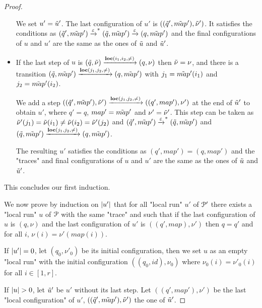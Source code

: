 \begin{proof}
\begin{itemize}
	We set $u' = \Tilde{u}'$. The last configuration of $u'$ is $((\Tilde{q}', \Tilde{map}'), \Tilde{\nu}')$. It satisfies the conditions as $(\Tilde{q}', \Tilde{map}') \xrightarrow{\varepsilon}^* (\Tilde{q}, \Tilde{map}') \xrightarrow{\varepsilon} (q, \Tilde{map}')$ and the final configurations of $u$ and $u'$ are the same as the ones of $\Tilde{u}$ and $\Tilde{u}'$.
		
	\item 
	If the last step of $u$ is $(\Tilde{q}, \Tilde{\nu}) \xrightarrow{\textbf{loc}(i_1,i_2,{\ne})} (q, \nu)$ then $\Tilde{\nu} = \nu$, and there is a transition $(\Tilde{q}, \Tilde{map}') \xrightarrow{\textbf{loc}(j_1,j_2,{\ne})} (q, \Tilde{map}')$ with $j_1=\Tilde{map}'(i_1)$ and $j_2=\Tilde{map}'(i_2)$.
	
	We add a step $((\Tilde{q}', \Tilde{map}'), \Tilde{\nu}') \xrightarrow{\textbf{loc}(j_1,j_2,{\ne})} ((q', map'), \nu')$ at the end of $\Tilde{u}'$ to obtain $u'$, where $q' = q$, $map' = \Tilde{map}'$ and $\nu' = \Tilde{\nu}'$. 
	This step can be taken as $\Tilde{\nu}'(j_1) = \Tilde{\nu}(i_1) \neq \Tilde{\nu}(i_2) = \Tilde{\nu}'(j_2)$ and $(\Tilde{q}', \Tilde{map}') \xrightarrow{\varepsilon}^* (\Tilde{q}, \Tilde{map}')$ and $(\Tilde{q}, \Tilde{map}') \xrightarrow{\textbf{loc}(j_1,j_2,{\ne})} (q, \Tilde{map}')$.   
	
	The resulting $u'$ satisfies the conditions as $(q', map') = (q, map')$ and the "traces" and final configurations of $u$ and $u'$ are the same as the ones of $\Tilde{u}$ and $\Tilde{u}'$.
\end{itemize}
	
	This concludes our first induction.
	
	We now prove by induction on $|u'|$ that for all "local run" $u'$ of $\mathcal{P}'$ there exists a "local run" $u$ of $\mathcal{P}$ with the same "trace" and such that if the last configuration of $u$ is $(q,\nu)$ and the last configuration of $u'$ is $((q',map), \nu')$ then $q=q'$ and for all $i$, $\nu(i) = \nu'(map(i))$.  
	
	If $|u'| = 0$, let $(q_0, \nu'_0)$ be its initial configuration, then we  set $u$ as an empty "local run" with the initial configuration $((q_0, id), \nu_0)$ where $\nu_0(i) = \nu'_0(i)$ for all $i \in [1,r]$.
	
	If $\size{u}>0$, let $\Tilde{u}'$ be $u'$ without its last step. Let $((q', map'), \nu')$ be the last "local configuration" of $u'$, $((\Tilde{q}', \Tilde{map}'), \Tilde{\nu}')$ the one of $\Tilde{u}'$.
	

\end{proof}
